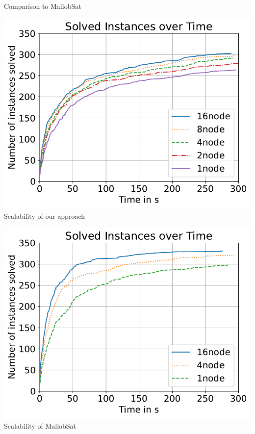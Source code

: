 \documentclass[]{sdqbeamer}
\begin{document}
\begin{frame}{Comparison to MallobSat}
    \begin{minipage}{0.45\textwidth}
        \center
        \includegraphics[scale=.8]{plots/cumulative_runtime/scalability_gim.pdf}\\
        Scalability of our approach
    \end{minipage}
    \hfill
    \begin{minipage}{0.45\textwidth}
        \center
        \includegraphics[scale=.8]{plots/cumulative_runtime/scalability_kis.pdf}\\
        Scalability of MallobSat%
    \end{minipage}
\end{frame}
\end{document}
